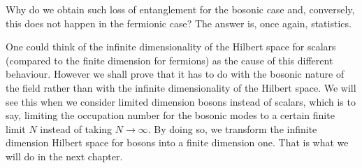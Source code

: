 Why do we obtain such loss of entanglement for the bosonic case and, conversely, this does not happen in the fermionic case? The answer is, once again, statistics. 

One could think of the infinite dimensionality of the Hilbert space for scalars (compared to the finite dimension for fermions) as the cause of this different behaviour. However we shall prove that it has to do with the bosonic nature of the field rather than with the infinite dimensionality of the Hilbert space. We will see this when we consider limited dimension bosons instead of scalars, which is to say, limiting the occupation number for the bosonic modes to a certain finite limit $N$ instead of taking $N\rightarrow\infty$. By doing so, we transform the infinite dimension Hilbert space for bosons into a finite dimension one. That is what we will do in the next chapter.

